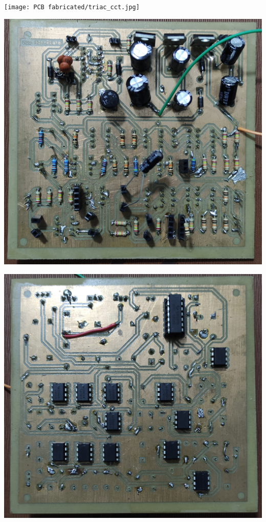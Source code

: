 \begin{multicols}{2}
\begin{minipage}{0.45\textwidth}
\centering
\texttt{[image: PCB fabricated/triac\_cct.jpg]}
\end{minipage}

\begin{minipage}{0.45\textwidth}
\centering
\includegraphics[width=\textwidth]{PCB fabricated/pcb2.jpg}
\end{minipage}

\begin{minipage}{0.45\textwidth}
\centering
\includegraphics[width=\textwidth]{PCB fabricated/pcb1.jpg}
\end{minipage}


\end{multicols}
